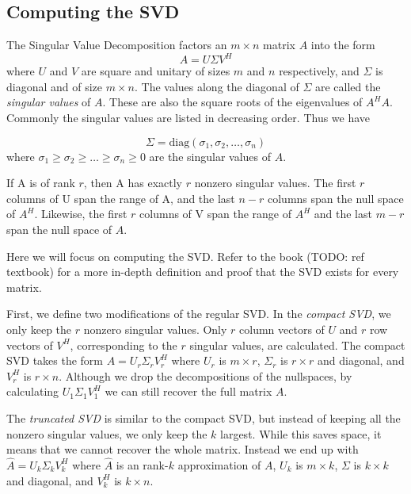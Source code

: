 \subsection*{Computing the SVD}


The Singular Value Decomposition factors an $m \times n$ matrix $A$ into the form
\begin{equation*}
A = U \Sigma V^H
\end{equation*}
where $U$ and $V$ are square and unitary of sizes $m$ and $n$ respectively, and $\Sigma$ is diagonal and of size $m \times n$.
The values along the diagonal of $\Sigma$ are called the \emph{singular values} of $A$. 
These are also the square roots of the eigenvalues of $A^HA$.
Commonly the singular values are listed in decreasing order. Thus we have

\begin{equation*}
\Sigma = \mbox{diag}(\sigma_1,\sigma_2,\ldots,\sigma_n)
\end{equation*}
where $\sigma_1 \geq \sigma_2 \geq \ldots \geq \sigma_n \geq 0$ are the singular values of $A$.

If A is of rank $r$, then A has exactly $r$ nonzero singular values.
The first $r$ columns of U span the range of A, and the last $n -r$ columns span the null space of $A^H$.
Likewise, the first $r$ columns of V span the range of $A^H$ and the last $m - r$ span the null space of $A$.

Here we will focus on computing the SVD. 
Refer to the book (TODO: ref textbook) for a more in-depth definition and proof that the SVD exists for every matrix.


First, we define two modifications of the regular SVD.
In the \emph{compact SVD}, we only keep the $r$ nonzero singular values.
Only $r$ column vectors of $U$ and $r$ row vectors of $V^H$, corresponding to the $r$ singular values, are calculated.
The compact SVD takes the form $A= U_r \Sigma_r V_r^H$ where $U_r$ is $m\times r$, $\Sigma_r$ is $r\times r$ and diagonal, and $V_r^H$ is $r\times n$.
Although we drop the decompositions of the nullspaces, by calculating $U_1 \Sigma_1 V_1^H$ we can still recover the full matrix $A$.

The \emph{truncated SVD} is similar to the compact SVD, but instead of keeping all the nonzero singular values, we only keep the $k$ largest.
While this saves space, it means that we cannot recover the whole matrix.
Instead we end up with $\widehat A = U_k\Sigma_k V_k^H$ where $\widehat A$ is an rank-$k$ approximation of $A$, $U_k$ is $m\times k$, $\Sigma$ is $k \times k$ and diagonal, and $V_k^H$ is $k \times n$.

